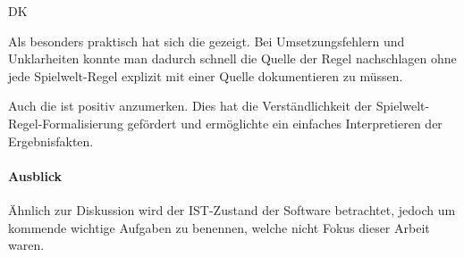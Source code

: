 \begin{enumerateWithCode}{DK}
    \item Als besonders praktisch hat sich die  gezeigt.
    Bei Umsetzungsfehlern und Unklarheiten konnte man dadurch schnell die Quelle der Regel nachschlagen ohne jede Spielwelt-Regel explizit mit einer Quelle dokumentieren zu müssen.

    \item Auch die  ist positiv anzumerken.
    Dies hat die Verständlichkeit der Spielwelt-Regel-Formalisierung gefördert und ermöglichte ein einfaches Interpretieren der Ergebnisfakten.

\end{enumerateWithCode}


\paragraph{Ausblick}\label{par:ausblick}
Ähnlich zur Diskussion wird der IST-Zustand der Software betrachtet, jedoch um kommende wichtige Aufgaben zu benennen, welche nicht Fokus dieser Arbeit waren.

